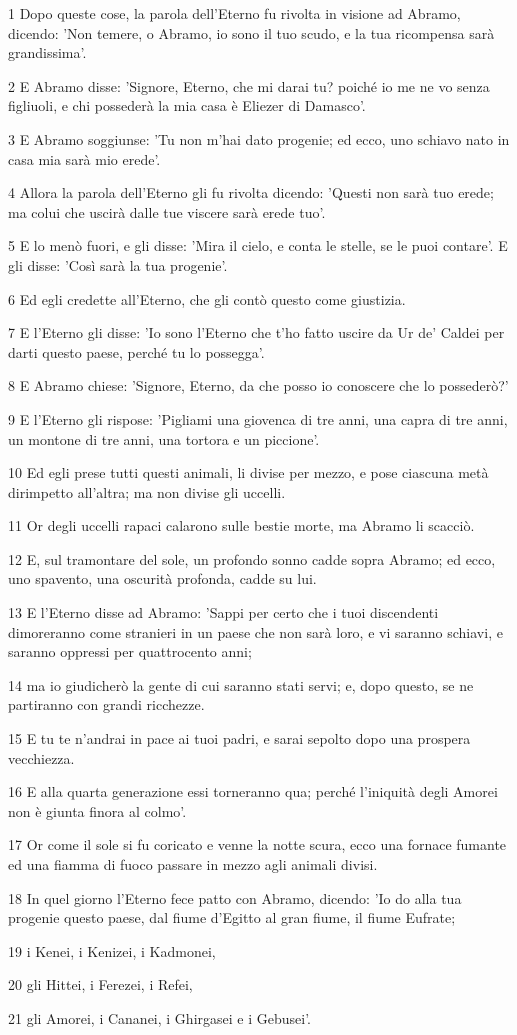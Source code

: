\par 1 Dopo queste cose, la parola dell'Eterno fu rivolta in visione ad Abramo, dicendo: 'Non temere, o Abramo, io sono il tuo scudo, e la tua ricompensa sarà grandissima'.
\par 2 E Abramo disse: 'Signore, Eterno, che mi darai tu? poiché io me ne vo senza figliuoli, e chi possederà la mia casa è Eliezer di Damasco'.
\par 3 E Abramo soggiunse: 'Tu non m'hai dato progenie; ed ecco, uno schiavo nato in casa mia sarà mio erede'.
\par 4 Allora la parola dell'Eterno gli fu rivolta dicendo: 'Questi non sarà tuo erede; ma colui che uscirà dalle tue viscere sarà erede tuo'.
\par 5 E lo menò fuori, e gli disse: 'Mira il cielo, e conta le stelle, se le puoi contare'. E gli disse: 'Così sarà la tua progenie'.
\par 6 Ed egli credette all'Eterno, che gli contò questo come giustizia.
\par 7 E l'Eterno gli disse: 'Io sono l'Eterno che t'ho fatto uscire da Ur de' Caldei per darti questo paese, perché tu lo possegga'.
\par 8 E Abramo chiese: 'Signore, Eterno, da che posso io conoscere che lo possederò?'
\par 9 E l'Eterno gli rispose: 'Pigliami una giovenca di tre anni, una capra di tre anni, un montone di tre anni, una tortora e un piccione'.
\par 10 Ed egli prese tutti questi animali, li divise per mezzo, e pose ciascuna metà dirimpetto all'altra; ma non divise gli uccelli.
\par 11 Or degli uccelli rapaci calarono sulle bestie morte, ma Abramo li scacciò.
\par 12 E, sul tramontare del sole, un profondo sonno cadde sopra Abramo; ed ecco, uno spavento, una oscurità profonda, cadde su lui.
\par 13 E l'Eterno disse ad Abramo: 'Sappi per certo che i tuoi discendenti dimoreranno come stranieri in un paese che non sarà loro, e vi saranno schiavi, e saranno oppressi per quattrocento anni;
\par 14 ma io giudicherò la gente di cui saranno stati servi; e, dopo questo, se ne partiranno con grandi ricchezze.
\par 15 E tu te n'andrai in pace ai tuoi padri, e sarai sepolto dopo una prospera vecchiezza.
\par 16 E alla quarta generazione essi torneranno qua; perché l'iniquità degli Amorei non è giunta finora al colmo'.
\par 17 Or come il sole si fu coricato e venne la notte scura, ecco una fornace fumante ed una fiamma di fuoco passare in mezzo agli animali divisi.
\par 18 In quel giorno l'Eterno fece patto con Abramo, dicendo: 'Io do alla tua progenie questo paese, dal fiume d'Egitto al gran fiume, il fiume Eufrate;
\par 19 i Kenei, i Kenizei, i Kadmonei,
\par 20 gli Hittei, i Ferezei, i Refei,
\par 21 gli Amorei, i Cananei, i Ghirgasei e i Gebusei'.

